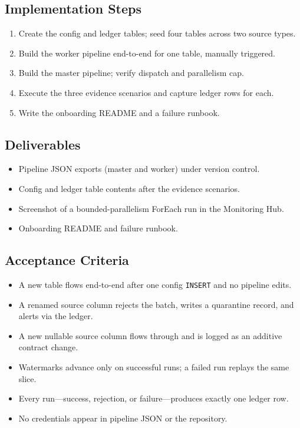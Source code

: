 \subsection*{Implementation Steps}
\begin{enumerate}
    \item Create the config and ledger tables; seed four tables across two source types.
    \item Build the worker pipeline end-to-end for one table, manually triggered.
    \item Build the master pipeline; verify dispatch and parallelism cap.
    \item Execute the three evidence scenarios and capture ledger rows for each.
    \item Write the onboarding README and a failure runbook.
\end{enumerate}

\subsection*{Deliverables}
\begin{itemize}
    \item Pipeline JSON exports (master and worker) under version control.
    \item Config and ledger table contents after the evidence scenarios.
    \item Screenshot of a bounded-parallelism ForEach run in the Monitoring Hub.
    \item Onboarding README and failure runbook.
\end{itemize}

\subsection*{Acceptance Criteria}
\begin{itemize}
    \item[\(\square\)] A new table flows end-to-end after one config \texttt{INSERT} and no pipeline edits.
    \item[\(\square\)] A renamed source column rejects the batch, writes a quarantine record, and alerts via the ledger.
    \item[\(\square\)] A new nullable source column flows through and is logged as an additive contract change.
    \item[\(\square\)] Watermarks advance only on successful runs; a failed run replays the same slice.
    \item[\(\square\)] Every run---success, rejection, or failure---produces exactly one ledger row.
    \item[\(\square\)] No credentials appear in pipeline JSON or the repository.
\end{itemize}

